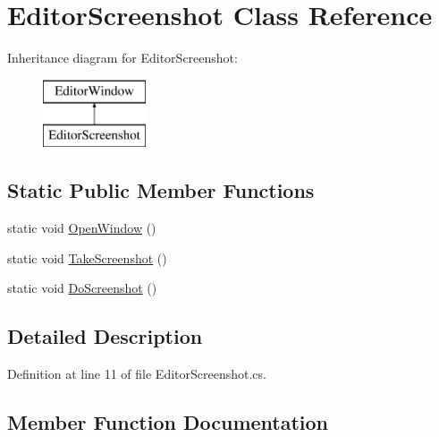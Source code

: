 \hypertarget{class_editor_screenshot}{}\section{Editor\+Screenshot Class Reference}
\label{class_editor_screenshot}
Inheritance diagram for Editor\+Screenshot\+:\begin{figure}[H]
\begin{center}
\leavevmode
\includegraphics[height=2.000000cm]{class_editor_screenshot}
\end{center}
\end{figure}
\subsection*{Static Public Member Functions}
\begin{DoxyCompactItemize}
\item 
static void \mbox{\hyperlink{class_editor_screenshot_aa4267b985645b4981cc2f3327f862447}{Open\+Window}} ()
\item 
static void \mbox{\hyperlink{class_editor_screenshot_a3e55a3867618ca638fdbf289161aa6f8}{Take\+Screenshot}} ()
\item 
static void \mbox{\hyperlink{class_editor_screenshot_a51331b435c4d31a59c1c1b19583dfed8}{Do\+Screenshot}} ()
\end{DoxyCompactItemize}


\subsection{Detailed Description}


Definition at line 11 of file Editor\+Screenshot.\+cs.



\subsection{Member Function Documentation}
\mbox{\label{class_editor_screenshot_a51331b435c4d31a59c1c1b19583dfed8}} 
